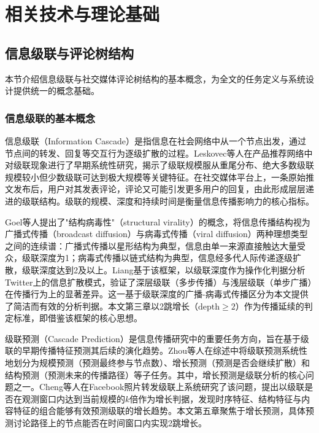 \chapter{相关技术与理论基础}

\section{信息级联与评论树结构}

本节介绍信息级联与社交媒体评论树结构的基本概念，为全文的任务定义与系统设计提供统一的概念基础。

\subsection{信息级联的基本概念}

信息级联（Information Cascade）是指信息在社会网络中从一个节点出发，通过节点间的转发、回复等交互行为逐级扩散的过程。Leskovec等人\cite{leskovec2007cascading}在产品推荐网络中对级联现象进行了早期系统性研究，揭示了级联规模服从重尾分布、绝大多数级联规模较小但少数级联可达到极大规模等关键特征。在社交媒体平台上，一条原始推文发布后，用户对其发表评论，评论又可能引发更多用户的回复，由此形成层层递进的级联结构。级联的规模、深度和持续时间是衡量信息传播影响力的核心指标。

Goel等人\cite{goel2016structural}提出了"结构病毒性"（structural virality）的概念，将信息传播结构视为广播式传播（broadcast diffusion）与病毒式传播（viral diffusion）两种理想类型之间的连续谱：广播式传播以星形结构为典型，信息由单一来源直接触达大量受众，级联深度为1；病毒式传播以链式结构为典型，信息经多代人际传递逐级扩散，级联深度达到2及以上。Liang\cite{liang2018broadcast}基于该框架，以级联深度作为操作化判据分析Twitter上的信息扩散模式，验证了深层级联（多步传播）与浅层级联（单步广播）在传播行为上的显著差异。这一基于级联深度的广播-病毒式传播区分为本文提供了简洁而有效的分析判据。本文第三章以2跳增长（$\text{depth} \geq 2$）作为传播延续的判定标准，即借鉴该框架的核心思想。

级联预测（Cascade Prediction）是信息传播研究中的重要任务方向，旨在基于级联的早期传播特征预测其后续的演化趋势。Zhou等人\cite{zhou2021survey}在综述中将级联预测系统性地划分为规模预测（预测最终参与节点数）、增长预测（预测是否会继续扩散）和结构预测（预测未来的传播路径）等子任务。其中，增长预测是级联分析的核心问题之一。Cheng等人\cite{cheng2014cascades}在Facebook照片转发级联上系统研究了该问题，提出以级联是否在观测窗口内达到当前规模的$k$倍作为增长判据，发现时序特征、结构特征与内容特征的组合能够有效预测级联的增长趋势。本文第五章聚焦于增长预测，具体预测讨论路径上的节点能否在时间窗口内实现2跳增长。

